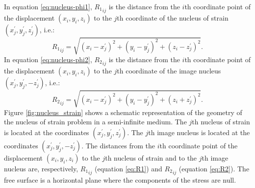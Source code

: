 \documentclass[journal abbreviation, manuscript]{copernicus}
\begin{document}
In equation \ref{eq:nucleus-phi1}, $ {R_1}_{ij}$ is the distance from the $i$th coordinate point of the displacement $ (x_{i}, y_{i}, z_{i})$ to the $j$th coordinate of the nucleus of strain $(x^{\prime}_{j}, y^{\prime}_{j}, z^{\prime}_{j})$, i.e.:
\begin{equation}
{R_1}_{ij} = {\sqrt{(x_{i}- x^{\prime}_{j})^{2} + (y_{i} - y^{\prime}_{j})^{2} + 
(z_{i} - z^{\prime}_{j})^{2}}}.
\label{eq:R1}
\end{equation}
In equation \ref{eq:nucleus-phi2}, $ {R_2}_{ij}$ is the distance from the $i$th coordinate point of the displacement $ (x_{i}, y_{i}, z_{i})$ to the $j$th coordinate of the image nucleus $(x^{\prime}_{j}, y^{\prime}_{j}, - z^{\prime}_{j})$, i.e.:
\begin{equation}
{R_2}_{ij} = {\sqrt{(x_{i}- x^{\prime}_{j})^{2} + (y_{i} - y^{\prime}_{j})^{2} + 
(z_{i} + z^{\prime}_{j})^{2}}}.
\label{eq:R2}
\end{equation}
Figure \ref{fig:nucleus_strain} shows a schematic representation of the geometry
of the nucleus of strain problem in a semi-infinite medium. 
The $j$th nucleus of strain is located at the coordinates 
$(x^{\prime}_{j}, y^{\prime}_{j}, z^{\prime}_{j})$. 
The $j$th image nucleus is located at the coordinates 
$(x^{\prime}_{j}, y^{\prime}_{j}, - z^{\prime}_{j})$.
The distances from the $i$th coordinate point of the displacement $ (x_{i}, y_{i}, z_{i})$ to the $j$th nucleus of strain and to the $j$th image nucleus are, respectively,  
$ {R_1}_{ij}$ (equation \ref{eq:R1})  and $ {R_2}_{ij}$ (equation \ref{eq:R2}).
The free surface is a horizontal plane where the components of the stress are null.
 
\end{document}

